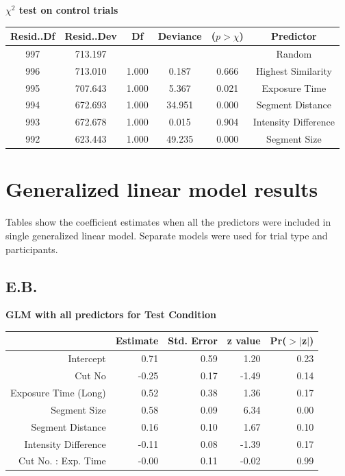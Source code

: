 \documentclass{article}
\begin{document}
\label{table:participantsAnovaJSControl}    
\textbf{$\chi^2$ test on control trials}
\begin{table}[ht]
    \centering    
    \begin{tabular}{cccccc}
    \hline
    Resid..Df & Resid..Dev &    Df & Deviance & ($p > \chi$) &    Predictor \\
    \hline
      997 &    713.197 &       &          &            &             Random \\
      996 &    713.010 & 1.000 &    0.187 &      0.666 & Highest Similarity \\
      995 &    707.643 & 1.000 &    5.367 &      0.021 &          Exposure Time \\
      994 &    672.693 & 1.000 &   34.951 &      0.000 &          Segment Distance \\
      993 &    672.678 & 1.000 &    0.015 &      0.904 &         Intensity Difference \\
      992 &    623.443 & 1.000 &   49.235 &      0.000 &          Segment Size \\
    \hline
    \end{tabular}    
\end{table}
\clearpage

\section{Generalized linear model results}
Tables show the coefficient estimates when all the predictors were included in single generalized linear model. Separate models were used for trial type and participants.

\subsection*{E.B.}
\textbf{GLM with all predictors for Test Condition}
\begin{table}[ht]
\centering
\begin{tabular}{rrrrr}
  \hline
 & Estimate & Std. Error & z value & Pr($>$$|$z$|$) \\ 
  \hline
Intercept & 0.71 & 0.59 & 1.20 & 0.23 \\ 
  Cut No & -0.25 & 0.17 & -1.49 & 0.14 \\ 
  Exposure Time (Long) & 0.52 & 0.38 & 1.36 & 0.17 \\ 
  Segment Size & 0.58 & 0.09 & 6.34 & 0.00 \\ 
  Segment Distance & 0.16 & 0.10 & 1.67 & 0.10 \\ 
  Intensity Difference & -0.11 & 0.08 & -1.39 & 0.17 \\ 
  Cut No. : Exp. Time & -0.00 & 0.11 & -0.02 & 0.99 \\ 
   \hline
\end{tabular}
\end{table}
\end{document}
